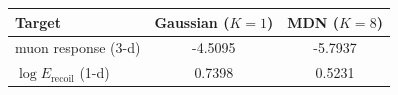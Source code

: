 \begin{tabular}{lcc}
\toprule
Target & Gaussian ($K=1$) & MDN ($K=8$) \\
\midrule
muon response (3-d) & -4.5095 & -5.7937 \\
$\log E_\mathrm{recoil}$ (1-d) & 0.7398 & 0.5231 \\
\bottomrule
\end{tabular}
